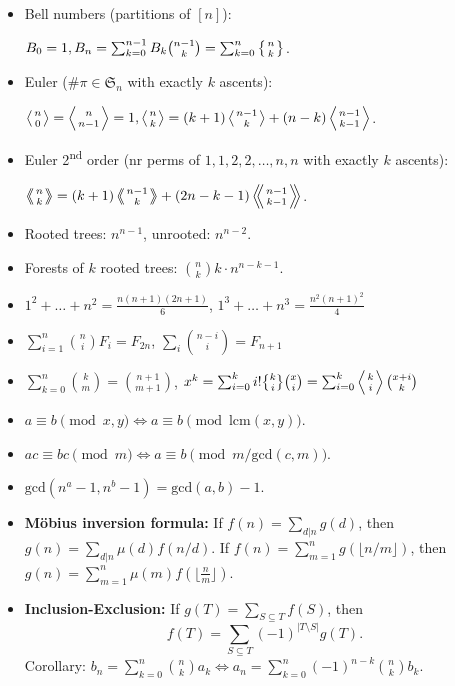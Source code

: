 \documentclass[9pt,a4paper,landscape,oneside]{amsart}
\DeclareRobustCommand{\stirling}{\genfrac\{\}{0pt}{}}
\newenvironment{myitemize}
{\begin{itemize}[leftmargin=.3cm]
	\setlength{\itemsep}{0pt}
	\setlength{\parskip}{0pt}
	\setlength{\parsep}{0pt}     }
{ \end{itemize}                  }
\begin{document}
\begin{multicols*}{3}
\begin{myitemize}
		$\left\{{n\atop 1}\right\}=\left\{{n\atop n}\right\}=1, \left\{{n\atop k}\right\} = k \left\{{ n-1 \atop k }\right\} + \left\{{n-1\atop k-1}\right\}$.

    \item Bell numbers (partitions of $[n]$):

		$B_0 = 1, B_n = \sum_{k=0}^{n-1} B_k \binom{n-1}{k} = \sum_{k=0}^n\left\{{n\atop k}\right\}$.

	\item Euler ($\# \pi \in \mathfrak{S}_n$ with exactly $k$ ascents):

		$\left \langle {n\atop 0} \right \rangle = \left \langle {n\atop n-1} \right \rangle = 1, \left \langle {n\atop k} \right \rangle = (k+1) \left \langle {n-1\atop {k}} \right \rangle + (n-k)\left \langle {{n-1}\atop {k-1}} \right \rangle$.

	\item Euler 2\textsuperscript{nd} order (nr perms of ${1, 1, 2, 2, \dots, n, n}$ with exactly $k$ ascents):

		$\left \langle \!\!\left \langle {n\atop k} \right \rangle \!\! \right \rangle = (k+1) \left \langle \!\! \left \langle {{n-1}\atop {k}} \right \rangle \!\! \right \rangle +(2n-k-1)\left \langle \!\! \left \langle {{n-1}\atop {k-1}} \right \rangle  \!\! \right \rangle$.

	\item Rooted trees: $n^{n-1}$, unrooted: $n^{n-2}$.
	\item Forests of $k$ rooted trees: $\binom{n}{k} k \cdot n^{n-k-1}$.
	\item $1^2 + \dots + n^2 = \frac{n(n+1)(2n+1)}{6}$, \quad $1^3 + \dots + n^3 = \frac{n^2(n+1)^2}{4}$ \\
	\item $\sum_{i=1}^n \binom{n}{i} F_i = F_{2n}$, \quad $\sum_{i} \binom{n-i}{i} = F_{n+1}$
	\item $\sum_{k=0}^n \binom{k}{m} = \binom{n+1}{m+1}$, \quad $x^k = \sum_{i=0}^k i!\stirling{k}{i}\binom{x}{i} = \sum_{i=0}^k \left\langle {k \atop i} \right\rangle\binom{x+i}{k}$
	\item $a\equiv b \pmod{x,y} \Leftrightarrow a \equiv b \pmod{\mathrm{lcm}(x,y)}$.
	\item $ac \equiv bc \pmod{m} \Leftrightarrow a \equiv b \pmod{m/\mathrm{gcd}(c,m)}$.
	\item $\mathrm{gcd}(n^a-1,n^b-1) = \mathrm{gcd}(a,b)-1$.
	\item \textbf{Möbius inversion formula:} If $f(n) = \sum_{d|n} g(d)$, then $g(n) = \sum_{d|n} \mu(d) f(n/d)$. If $f(n) = \sum_{m=1}^n g(\lfloor n/m\rfloor)$, then $g(n) = \sum_{m=1}^n \mu(m)f(\lfloor\frac{n}{m}\rfloor)$.
	\item \textbf{Inclusion-Exclusion:} If $g(T) = \sum_{S \subseteq T} f(S)$, then
	\[
		f(T) = \sum_{S \subseteq T} (-1)^{\lvert T \setminus S \rvert} g(T).
	\]
	Corollary:
		$b_n = \sum_{k=0}^{n} \binom{n}{k} a_k \Longleftrightarrow a_n = \sum_{k=0}^{n} (-1)^{n-k} \binom{n}{k} b_k$.


\end{myitemize}
\end{multicols*}
\end{document}
